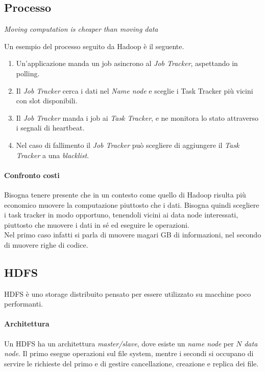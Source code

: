 \subsection{Processo}
\begin{center}
        \emph{Moving computation is cheaper than moving data}
\end{center}
Un esempio del processo seguito da Hadoop è il seguente.
\begin{enumerate}
        \item Un'applicazione manda un job asincrono al \emph{Job Tracker}, aspettando in polling.
        \item Il \emph{Job Tracker} cerca i dati nel \emph{Name node} e sceglie i Task Tracker più vicini
        con slot disponibili.
        \item Il \emph{Job Tracker} manda i job ai \emph{Task Tracker}, e ne monitora 
        lo stato attraverso i segnali di heartbeat. 
        \item Nel caso di fallimento il \emph{Job Tracker}
        può scegliere di aggiungere il \emph{Task Tracker} a una \emph{blacklist}.
\end{enumerate}

\paragraph{Confronto costi}
Bisogna tenere presente che in un contesto come quello di Hadoop risulta 
più economico muovere la computazione piuttosto che i dati.
Bisogna quindi scegliere i task tracker in modo opportuno, tenendoli vicini ai 
data node interessati, piuttosto che muovere i dati in sé ed eseguire le operazioni.\\
Nel primo caso infatti si parla di muovere magari GB di informazioni, nel secondo di muovere 
righe di codice.

\subsection{HDFS}
HDFS è uno storage distribuito pensato per essere utilizzato su macchine poco
performanti.

\paragraph{Architettura}
Un HDFS ha un architettura \emph{master/slave}, dove esiste un \emph{name node} per $N$ \emph{data node}.
Il primo esegue operazioni sul file system, mentre i secondi si occupano di 
servire le richieste del primo e di gestire cancellazione, creazione e replica dei 
file.


